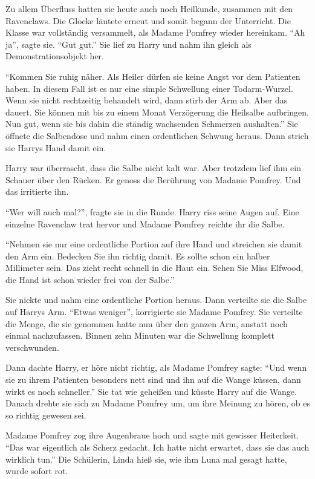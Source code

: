 Zu allem Überfluss hatten sie heute auch noch Heilkunde, zusammen mit den Ravenclaws. Die Glocke läutete erneut und somit begann der Unterricht. Die Klasse war vollständig versammelt, als Madame Pomfrey wieder hereinkam. \enquote{Ah ja}, sagte sie. \enquote{Gut gut.} Sie lief zu Harry und nahm ihn gleich als Demonstrationsobjekt her.

\enquote{Kommen Sie ruhig näher. Als Heiler dürfen sie keine Angst vor dem Patienten haben. In diesem Fall ist es nur eine simple Schwellung einer Todarm-Wurzel. Wenn sie nicht rechtzeitig behandelt wird, dann stirb der Arm ab. Aber das dauert. Sie können mit bis zu einem Monat Verzögerung die Heilsalbe aufbringen. Nun gut, wenn sie bis dahin die ständig wachsenden Schmerzen aushalten.} Sie öffnete die Salbendose und nahm einen ordentlichen Schwung heraus. Dann strich sie Harrys Hand damit ein.

Harry war überrascht, dass die Salbe nicht kalt war. Aber trotzdem lief ihm ein Schauer über den Rücken. Er genoss die Berührung von Madame Pomfrey. Und das irritierte ihn.

\enquote{Wer will auch mal?}, fragte sie in die Runde. Harry riss seine Augen auf. Eine einzelne Ravenclaw trat hervor und Madame Pomfrey reichte ihr die Salbe.

\enquote{Nehmen sie nur eine ordentliche Portion auf ihre Hand und streichen sie damit den Arm ein. Bedecken Sie ihn richtig damit. Es sollte schon ein halber Millimeter sein. Das zieht recht schnell in die Haut ein. Sehen Sie Miss Elfwood, die Hand ist schon wieder frei von der Salbe.}

Sie nickte und nahm eine ordentliche Portion heraus. Dann verteilte sie die Salbe auf Harrys Arm. \enquote{Etwas weniger}, korrigierte sie Madame Pomfrey. Sie verteilte die Menge, die sie genommen hatte nun über den ganzen Arm, anstatt noch einmal nachzufassen. Binnen zehn Minuten war die Schwellung komplett verschwunden.

Dann dachte Harry, er höre nicht richtig, als Madame Pomfrey sagte: \enquote{Und wenn sie zu ihrem Patienten besonders nett sind und ihn auf die Wange küssen, dann wirkt es noch schneller.} Sie tat wie geheißen und küsste Harry auf die Wange. Danach drehte sie sich zu Madame Pomfrey um, um ihre Meinung zu hören, ob es so richtig gewesen sei.

Madame Pomfrey zog ihre Augenbraue hoch und sagte mit gewisser Heiterkeit. \enquote{Das war eigentlich als Scherz gedacht. Ich hatte nicht erwartet, dass sie das auch wirklich tun.} Die Schülerin, Linda hieß sie, wie ihm Luna mal gesagt hatte, wurde sofort rot.

